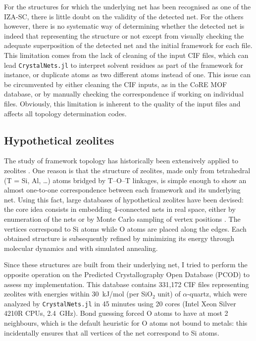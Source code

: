 \documentclass[main.tex]{subfiles}
\begin{document}
For the structures for which the underlying net has been recognised as one of the IZA-SC, there is little doubt on the validity of the detected net. For the others however, there is no systematic way of determining whether the detected net is indeed that representing the structure or not except from visually checking the adequate superposition of the detected net and the initial framework for each file. This limitation comes from the lack of cleaning of the input CIF files, which can lead \texttt{CrystalNets.jl} to interpret solvent residues as part of the framework for instance, or duplicate atoms as two different atoms instead of one. This issue can be circumvented by either cleaning the CIF inputs, as in the CoRE MOF database, or by manually checking the correspondence if working on individual files. Obviously, this limitation is inherent to the quality of the input files and affects all topology determination codes.

\subsection{Hypothetical zeolites}


The study of framework topology has historically been extensively applied to zeolites \autocite{TopochemistryZeolites}. One reason is that the structure of zeolites, made only from tetrahedral (T = Si, Al, \ldots) atoms bridged by T--O--T linkages, is simple enough to show an almost one-to-one correspondence between each framework and its underlying net. Using this fact, large databases of hypothetical zeolites have been devised: the core idea consists in embedding 4-connected nets in real space, either by enumeration of the nets \autocite{Treacy} or by Monte Carlo sampling of vertex positions \autocite{Deem}. The vertices correspond to Si atoms while O atoms are placed along the edges. Each obtained structure is subsequently refined by minimizing its energy through molecular dynamics and with simulated annealing.

Since these structures are built from their underlying net, I tried to perform the opposite operation on the Predicted Crystallography Open Database (PCOD) \autocite{Deem} to assess my implementation. This database contains 331,172 CIF files representing zeolites with energies within \SI{30}{kJ/mol} (per SiO$_2$ unit) of $\alpha$-quartz, which were analyzed by \texttt{CrystalNets.jl} in 45 minutes using 20 cores (Intel Xeon Silver 4210R CPUs, 2.4~GHz). Bond guessing forced O atoms to have at most 2 neighbours, which is the default heuristic for O atoms not bound to metals: this incidentally ensures that all vertices of the net correspond to Si atoms.
\end{document}
